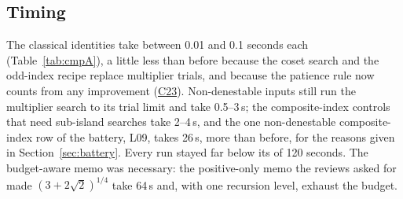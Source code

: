 \documentclass[11pt,oneside]{article}
\numberwithin{equation}{section}
\theoremstyle{definition}
\theoremstyle{remark}
\newcommand{\code}[1]{\texttt{\detokenize{#1}}}
\newcommand{\Cc}[1]{\hyperref[c:#1]{\textsf{C#1}}}
\begin{document}
\subsection{Timing}\label{sec:timing}
The classical identities take between 0.01 and 0.1 seconds each (Table~\ref{tab:cmpA}), a little less than before because the coset search and the odd-index recipe replace multiplier trials, and because the patience rule now counts from any improvement (\Cc{23}). Non-denestable inputs still run the multiplier search to its trial limit and take 0.5--3\,s; the composite-index controls that need sub-island searches take 2--4\,s, and the one non-denestable composite-index row of the battery, L09, takes 26\,s, more than before, for the reasons given in Section~\ref{sec:battery}. Every run stayed far below its \code{"TimeBudget"} of 120 seconds. The budget-aware memo was necessary: the positive-only memo the reviews asked for made $(3+2\sqrt2)^{1/4}$ take 64\,s and, with one recursion level, exhaust the budget.
\end{document}
